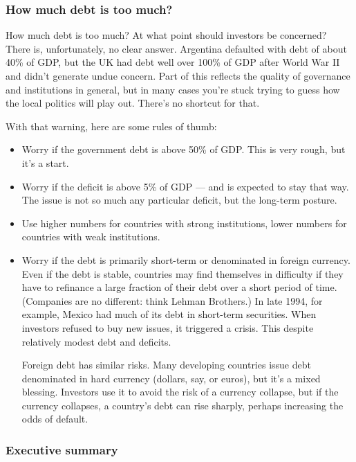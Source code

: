 \documentclass[letterpaper,12pt]{article}
\begin{document}
\subsubsection*{How much debt is too much?}

How much debt is too much?
At what point should investors be concerned?
There is, unfortunately, no clear answer.
Argentina defaulted with debt of about 40\% of GDP,
but the UK had debt well over 100\% of GDP after World War II
and didn't generate undue concern.
Part of this reflects the quality of governance and
institutions in general,
but in many cases you're stuck trying to
guess how the local politics will play out.
There's no shortcut for that.

With that warning, here are some rules of thumb:
%
\begin{itemize}
\item Worry if the government debt is above 50\% of GDP.
This is very rough, but it's a start.

\item Worry if the deficit is above 5\% of GDP ---
and is expected to stay that way.
The issue is not so much any particular deficit,
but the long-term posture.

\item Use higher numbers for countries with strong institutions,
lower numbers for countries with weak institutions.

\item Worry if the debt is primarily short-term or denominated in
foreign currency.
Even if the debt is stable, countries
may find themselves in difficulty if they have to refinance
a large fraction of their debt over a short period of time.
(Companies are no different:  think Lehman Brothers.)
In late 1994, for example, Mexico had much of its debt in short-term
securities.
When investors refused to buy new issues, it triggered a crisis.
This despite relatively modest debt and deficits.

Foreign debt has similar risks.
Many developing countries issue debt denominated in hard currency
(dollars, say, or euros), but it's a mixed blessing.
Investors use it to avoid the risk of a currency collapse,
but if the currency collapses,
a country's debt can rise sharply,
perhaps increasing the odds of default.

\end{itemize}



\subsubsection*{Executive summary}
\end{document}
